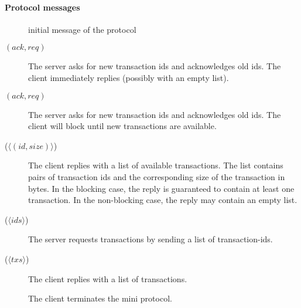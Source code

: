 \paragraph{Protocol messages}
\begin{description}
\item [\MsgInit] initial message of the protocol
\item [\MsgRequestTxIdsNB{} {\boldmath $(ack,req)$}]
      The server asks for new transaction ids and acknowledges old ids.
      The client immediately replies (possibly with an empty list).
\item [\MsgRequestTxIdsB{} {\boldmath $(ack,req)$}]
      The server asks for new transaction ids and acknowledges old ids.
      The client will block until new transactions are available.
\item [\MsgReplyTxIds{} {\boldmath ($\langle (id, size) \rangle$) }]
      The client replies with a list of available transactions.
      The list contains pairs of transaction ids and the corresponding size of the transaction in bytes.
      In the blocking case, the reply is guaranteed to contain at least one transaction.
      In the non-blocking case, the reply may contain an empty list.
\item [\MsgRequestTxs{} {\boldmath ($\langle ids \rangle$)}]
      The server requests transactions by sending a list of transaction-ids.
\item [\MsgReplyTxs{} {\boldmath ($\langle txs \rangle$})]
      The client replies with a list of transactions.
\item [\MsgDone]
      The client terminates the mini protocol.
\end{description}

